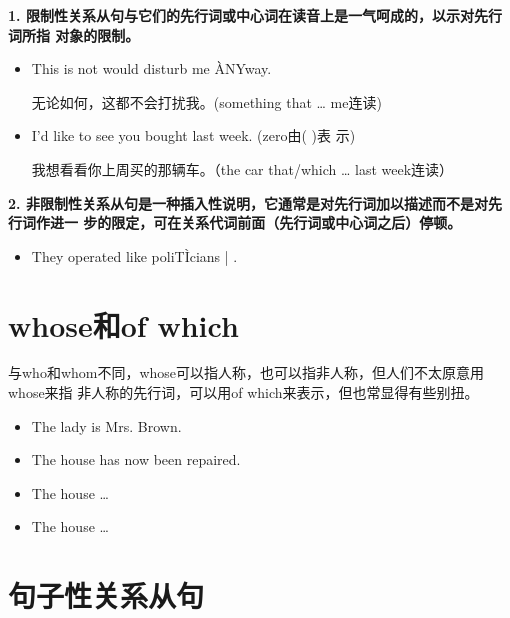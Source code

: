 \textbf{1. 限制性关系从句与它们的先行词或中心词在读音上是一气呵成的，以示对先行词所指
  对象的限制。}
\begin{itemize}
\item This is not   would disturb me \`{A}NYway.

  无论如何，这都不会打扰我。(something that \ldots{} me连读)
\item I'd like to see   you bought last week. (zero由( )表
  示)

  我想看看你上周买的那辆车。（the car that/which \ldots{} last week连读）

\end{itemize}

\textbf{2. 非限制性关系从句是一种插入性说明，它通常是对先行词加以描述而不是对先行词作进一
  步的限定，可在关系代词前面（先行词或中心词之后）停顿。}
\begin{itemize}
\item  They operated like poliT\`{I}cians | .
\end{itemize}

\section{whose和of which}

与who和whom不同，whose可以指人称，也可以指非人称，但人们不太原意用whose来指
非人称的先行词，可以用of which来表示，但也常显得有些别扭。
\begin{itemize}
\item The lady  is Mrs. Brown.
\item The house  has now been repaired.
\item The house  \ldots{}
\item The house   \ldots{}
\end{itemize}

\section{句子性关系从句}

